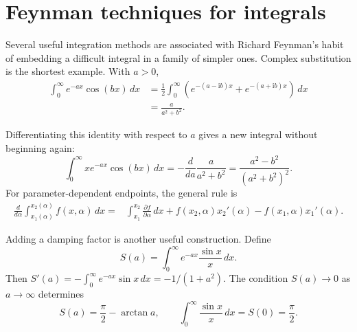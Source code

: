 \section{Feynman techniques for integrals}

Several useful integration methods are associated with Richard Feynman's habit of embedding a difficult integral in a family of simpler ones. Complex substitution is the shortest example. With $a>0$,
\begin{align}
\int_0^\infty e^{-ax}\cos(bx)\,dx
&=\frac12\int_0^\infty\left(e^{-(a-\mathrm{i}b)x}+e^{-(a+\mathrm{i}b)x}\right)\,dx\\
&=\frac{a}{a^2+b^2}.
\end{align}

Differentiating this identity with respect to $a$ gives a new integral without beginning again:
\begin{equation}
\int_0^\infty xe^{-ax}\cos(bx)\,dx
=-\frac{d}{da}\frac{a}{a^2+b^2}
=\frac{a^2-b^2}{(a^2+b^2)^2}.
\end{equation}
For parameter-dependent endpoints, the general rule is
\begin{align}
\frac{d}{d\alpha}\int_{x_1(\alpha)}^{x_2(\alpha)}f(x,\alpha)\,dx
={}&\int_{x_1}^{x_2}\frac{\partial f}{\partial\alpha}\,dx
+f(x_2,\alpha)x_2'(\alpha)-f(x_1,\alpha)x_1'(\alpha).
\end{align}

Adding a damping factor is another useful construction. Define
\begin{equation}
S(a)=\int_0^\infty e^{-ax}\frac{\sin x}{x}\,dx.
\end{equation}
Then $S'(a)=-\int_0^\infty e^{-ax}\sin x\,dx=-1/(1+a^2)$. The condition $S(a)\to0$ as $a\to\infty$ determines
\begin{equation}
S(a)=\frac{\pi}{2}-\arctan a,
\qquad \int_0^\infty\frac{\sin x}{x}\,dx=S(0)=\frac{\pi}{2}.
\end{equation}